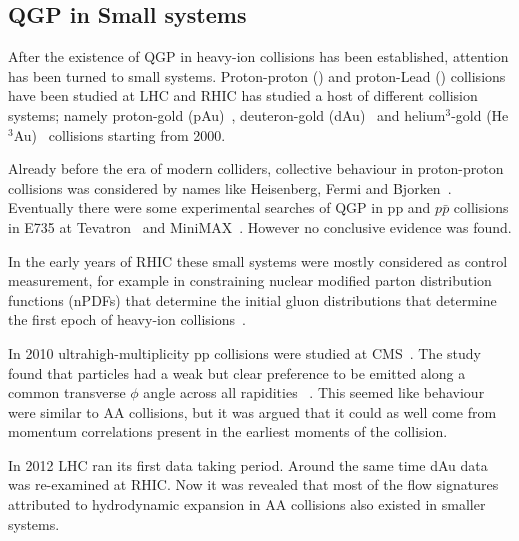 
\subsection{QGP in Small systems}
After the existence of QGP in heavy-ion collisions has been established, attention has been turned to small systems. Proton-proton (\pp) and proton-Lead (\pPb) collisions have been studied at LHC and RHIC has studied a host of different collision systems; namely proton-gold (pAu)~\cite{}, deuteron-gold (dAu)~\cite{} and helium$^3$-gold (He$^3$Au)~\cite{} collisions starting from 2000. %

Already before the era of modern colliders, collective behaviour in proton-proton collisions was considered by names like Heisenberg, Fermi and Bjorken~\cite{Nagle:2018nvi}. Eventually there were some experimental searches of QGP in pp and $p\bar p$ collisions in E735 at Tevatron~\cite{Alexopoulos:1993wt} and MiniMAX~\cite{Brooks:1999xy}. However no conclusive evidence was found. 

In the early years of RHIC these small systems were mostly considered as control measurement, for example in constraining nuclear modified parton distribution functions (nPDFs) that determine the initial gluon distributions that determine the first epoch of heavy-ion collisions~\cite{Shen:2015qta, Adare:2015lcd}. 

In 2010 ultrahigh-multiplicity pp collisions were studied at CMS~\cite{Khachatryan:2010gv}. The study found that particles had a weak but clear preference to be emitted along a common transverse $\phi$ angle across all rapidities ~\cite{Salgado:2016jws}. This seemed like behaviour were similar to AA collisions, but it was argued that it could as well come from momentum correlations present in the earliest moments of the collision.

In 2012 LHC ran its first \pPb data taking period. Around the same time dAu data was re-examined at RHIC. Now it was revealed that most of the flow signatures attributed to hydrodynamic expansion in AA collisions also existed in smaller systems.




